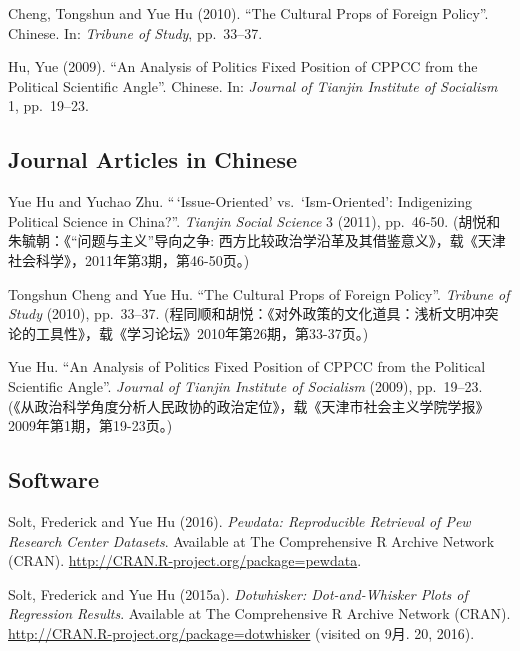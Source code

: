 \documentclass[10.5pt,]{article}
\begin{document}
Cheng, Tongshun and Yue Hu (2010). ``The Cultural Props of Foreign
Policy''. Chinese. In: \emph{Tribune of Study}, pp.~33--37.

Hu, Yue (2009). ``An Analysis of Politics Fixed Position of CPPCC from
the Political Scientific Angle''. Chinese. In:
\emph{Journal of Tianjin Institute of Socialism} 1, pp.~19--23.

\vspace{\baselineskip}

\hypertarget{journal-articles-in-chinese}{%
\subsection{Journal Articles in
Chinese}\label{journal-articles-in-chinese}}

Yue Hu and Yuchao Zhu. ``\,`Issue-Oriented' vs.~`Ism-Oriented':
Indigenizing Political Science in China?''. \emph{Tianjin Social
Science} 3 (2011), pp.~46-50. (胡悦和朱毓朝：《``问题与主义''导向之争:
西方比较政治学沿革及其借鉴意义》，载《天津社会科学》，2011年第3期，第46-50页。)

Tongshun Cheng and Yue Hu. ``The Cultural Props of Foreign Policy''.
\emph{Tribune of Study} (2010), pp.~33--37.
(程同顺和胡悦：《对外政策的文化道具：浅析文明冲突论的工具性》，载《学习论坛》2010年第26期，第33-37页。)

Yue Hu. ``An Analysis of Politics Fixed Position of CPPCC from the
Political Scientific Angle''. \emph{Journal of Tianjin Institute of
Socialism} (2009), pp.~19--23.
(《从政治科学角度分析人民政协的政治定位》，载《天津市社会主义学院学报》
2009年第1期，第19-23页。)

\vspace{\baselineskip}

\hypertarget{software}{%
\subsection{Software}\label{software}}

Solt, Frederick and Yue Hu (2016).
\emph{Pewdata: Reproducible Retrieval of Pew Research Center Datasets}.
Available at The Comprehensive R Archive Network (CRAN).
\url{http://CRAN.R-project.org/package=pewdata}.

Solt, Frederick and Yue Hu (2015a).
\emph{Dotwhisker: Dot-and-Whisker Plots of Regression Results}.
Available at The Comprehensive R Archive Network (CRAN).
\url{http://CRAN.R-project.org/package=dotwhisker} (visited on 9月. 20,
2016).
\end{document}
